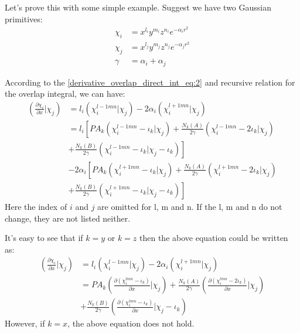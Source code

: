 Let's prove this with some simple example. Suggest we have two Gaussian 
primitives:
\begin{align}
 \chi_{i} &= x^{l_{i}}y^{m_{i}}z^{n_{i}} e^{-\alpha_{i} r^{2}} \nonumber \\
 \chi_{j} &= x^{l_{j}}y^{m_{j}}z^{n_{j}} e^{-\alpha_{j} r^{2}} \nonumber \\
 \gamma   &= \alpha_{i} + \alpha_{j}
 \end{align}

According to the \ref{derivative_overlap_direct_int_eq:2} and recursive relation
for the overlap integral, we can have:
\begin{equation}
 \begin{split}
 \left(\frac{\partial \chi_{i}}{\partial x}|\chi_{j}\right)  &= 
 l_{i}(\chi_{i}^{l-1mn}|\chi_{j}) - 2\alpha_{i} (\chi_{i}^{l+1mn}|\chi_{j}) \\
 &= l_{i}\left[ PA_{k}(\chi_{i}^{l-1mn}-\iota_{k}|\chi_{j}) + 
 \frac{N_{k}(A)}{2 \gamma}(\chi_{i}^{l-1mn}-2\iota_{k}|\chi_{j})  \right. \\ 
 &+ \left. \frac{N_{k}(B)}{2 \gamma}(\chi_{i}^{l-1mn}-\iota_{k}|\chi_{j}-\iota_{k})
 \right] \\
 &-2\alpha_{i} \left[ PA_{k}(\chi_{i}^{l+1mn}-\iota_{k}|\chi_{j}) + 
 \frac{N_{k}(A)}{2 \gamma}(\chi_{i}^{l+1mn}-2\iota_{k}|\chi_{j}) \right. \\ 
 &+ \left. \frac{N_{k}(B)}{2 \gamma}(\chi_{i}^{l+1mn}-\iota_{k}|\chi_{j}-\iota_{k})
 \right] 
 \end{split}
 \label{deriv_os_overlap:1}
\end{equation}
Here the index of $i$ and $j$ are omitted for l, m and n. If the l, m and n do not 
change, they are not listed neither.

It's easy to see that if $k = y$ or $k = z$ then the above equation could be 
written as:
\begin{equation}
 \begin{split}
  \left(\frac{\partial \chi_{i}}{\partial x}|\chi_{j}\right)  &= 
 l_{i}(\chi_{i}^{l-1mn}|\chi_{j}) - 2\alpha_{i} (\chi_{i}^{l+1mn}|\chi_{j}) \\ 
 &=  PA_{k}(\frac{\partial(\chi_{i}^{lmn}-\iota_{k})}{\partial x}|\chi_{j}) + 
 \frac{N_{k}(A)}{2 \gamma}(\frac{\partial(\chi_{i}^{lmn}-2\iota_{k})}{\partial x}|\chi_{j}) 
 \\ 
 &+ \frac{N_{k}(B)}{2 \gamma}
 (\frac{\partial (\chi_{i}^{lmn}-\iota_{k}) }{\partial x}|\chi_{j}-\iota_{k}) 
 \end{split}
\end{equation}
However, if $k = x$, the above equation does not hold.

